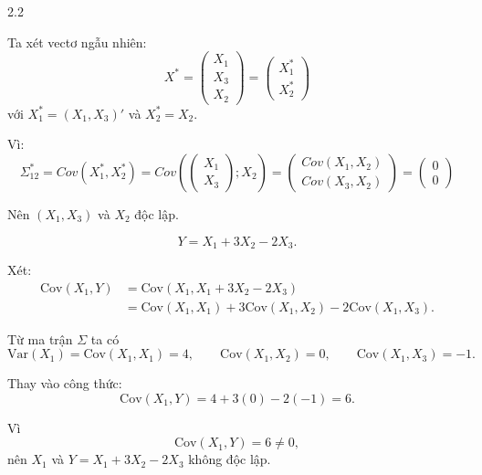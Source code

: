 \begin{question}{2.2}
\begin{subquestion}
\begin{answer}
Ta xét vectơ ngẫu nhiên:
$$ X^* = \begin{pmatrix} X_1 \\ X_3 \\ \hline X_2 \end{pmatrix} = \begin{pmatrix} X_1^* \\ X_2^* \end{pmatrix} $$
với $X_1^* = (X_1, X_3)'$ và $X_2^* = X_2$.

Vì: $$ \Sigma_{12}^* = Cov(X_1^*, X_2^*) = Cov\left( \begin{pmatrix} X_1 \\ X_3 \end{pmatrix}; X_2 \right) = \begin{pmatrix} Cov(X_1, X_2) \\ Cov(X_3, X_2) \end{pmatrix} = \begin{pmatrix} 0 \\ 0 \end{pmatrix} $$

Nên $(X_1, X_3)$ và $X_2$ độc lập.
\end{answer}
\end{subquestion}

\begin{subquestion}
\begin{answer}

\[
Y=X_1+3X_2-2X_3.
\]

Xét:
\begin{align*}
\mathrm{Cov}(X_1,Y)
&=\mathrm{Cov}(X_1,X_1+3X_2-2X_3) \\
&=\mathrm{Cov}(X_1,X_1)+3\mathrm{Cov}(X_1,X_2)-2\mathrm{Cov}(X_1,X_3).
\end{align*}

Từ ma trận $\Sigma$ ta có
\[
\mathrm{Var}(X_1)=\mathrm{Cov}(X_1,X_1)=4,
\qquad
\mathrm{Cov}(X_1,X_2)=0,
\qquad
\mathrm{Cov}(X_1,X_3)=-1.
\]

Thay vào công thức:
\[
\mathrm{Cov}(X_1,Y)
=4+3(0)-2(-1)=6.
\]

Vì
\[
\mathrm{Cov}(X_1,Y)=6\neq0,
\]
nên $X_1$ và $Y=X_1+3X_2-2X_3$ không độc lập.


\end{answer}
\end{subquestion}
\end{question}
